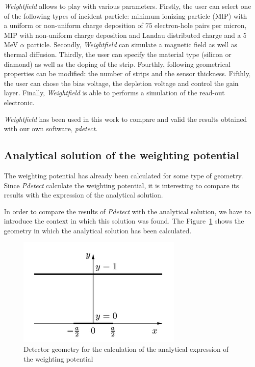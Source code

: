 \documentclass[11pt]{article}
\begin{document}
		\textit{Weightfield} allows to play with various parameters. Firstly, the user
		can select one of the following types of incident particle:
		minimum ionizing particle (MIP) with a uniform or non-uniform charge deposition of 75
		electron-hole pairs per micron, MIP with non-uniform charge deposition and
		Landau distributed charge and a 5 MeV $\alpha$ particle. Secondly, \textit{Weightfield}
		can simulate a magnetic field as well as thermal diffusion. Thirdly, the user
		can specify the material type (silicon or diamond) as well as the doping
		of the strip. Fourthly, following geometrical properties can be modified:
		the number of strips and the sensor thickness. Fifthly, the user can
		chose the bias voltage, the depletion voltage and control the gain layer. Finally,
		\textit{Weightfield} is able to performs a simulation of the read-out
		electronic.

		\textit{Weightfield} has been used in this work to compare and valid the results
		obtained with our own software, \textit{pdetect}.

	\subsection{Analytical solution of the weighting potential}

		The weighting potential has already been calculated for some type of geometry.
		Since \textit{Pdetect} calculate the weighting potential, it is interesting to compare
		its results with the expression of the analytical solution.

		In order to compare the results of \textit{Pdetect} with the analytical solution,
		we have to introduce the context in which this solution was found. The Figure~\ref{fig:analytic}
		shows the geometry in which the analytical solution has been calculated.

		\begin{figure}[H]
			\center
			\includegraphics[scale=0.5]{images/boundary_conditions/detector/analytic.png}
			\caption{Detector geometry for the calculation of the analytical expression of the weighting
				potential~\cite{pixeldetector}}
			\label{fig:analytic}
		\end{figure}
\end{document}
